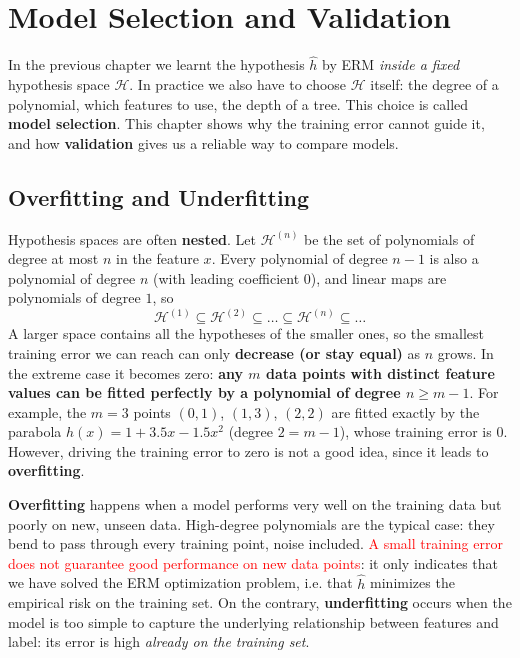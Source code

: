 \chapter{Model Selection and Validation}

In the previous chapter we learnt the hypothesis $\widehat{h}$ by ERM \emph{inside a fixed} hypothesis space $\mathcal{H}$. In practice we also have to choose $\mathcal{H}$ itself: the degree of a polynomial, which features to use, the depth of a tree. This choice is called \textbf{model selection}. This chapter shows why the training error cannot guide it, and how \textbf{validation} gives us a reliable way to compare models.

\section{Overfitting and Underfitting}
Hypothesis spaces are often \textbf{nested}. Let $\mathcal{H}^{(n)}$ be the set of polynomials of degree at most $n$ in the feature $x$. Every polynomial of degree $n-1$ is also a polynomial of degree $n$ (with leading coefficient $0$), and linear maps are polynomials of degree $1$, so
\[
\mathcal{H}^{(1)} \subseteq \mathcal{H}^{(2)} \subseteq \dots \subseteq \mathcal{H}^{(n)} \subseteq \dots
\]
A larger space contains all the hypotheses of the smaller ones, so the smallest training error we can reach can only \textbf{decrease (or stay equal)} as $n$ grows. In the extreme case it becomes zero: \textbf{any $m$ data points with distinct feature values can be fitted perfectly by a polynomial of degree $n \geq m-1$}. For example, the $m=3$ points $(0,1)$, $(1,3)$, $(2,2)$ are fitted exactly by the parabola $h(x) = 1 + 3.5x - 1.5x^2$ (degree $2 = m-1$), whose training error is $0$. However, driving the training error to zero is not a good idea, since it leads to \textbf{overfitting}.

\textbf{Overfitting} happens when a model performs very well on the training data but poorly on new, unseen data. High-degree polynomials are the typical case: they bend to pass through every training point, noise included. \textcolor{red}{A small training error does not guarantee good performance on new data points}: it only indicates that we have solved the ERM optimization problem, i.e. that $\widehat{h}$ minimizes the empirical risk on the training set. On the contrary, \textbf{underfitting} occurs when the model is too simple to capture the underlying relationship between features and label: its error is high \emph{already on the training set}.

